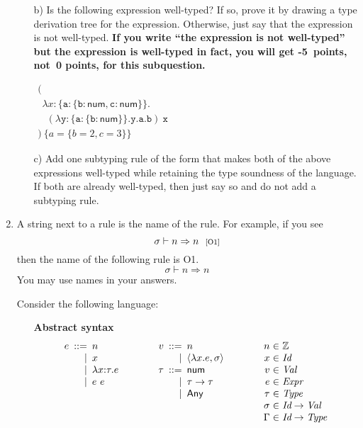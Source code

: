 \begin{enumerate}
\begin{itemize}
\item[b)] Is the following expression well-typed? If so, prove it by
  drawing a type derivation tree for the expression. Otherwise, just say that
    the expression is not well-typed. \textbf{If you write ``the expression is not
    well-typed'' but the expression is well-typed in fact, you will get
    -5~points, not~0 points, for this subquestion.}

$
  \begin{array}{l}
    ( \\
    \ \ \lambda x{:}\{\texttt{a}{:}\{\texttt{b}{:}\textsf{num},\texttt{c}{:}\textsf{num}\}\}. \\
    \ \ \ \ (\lambda \texttt{y}{:}\{\texttt{a}{:}\{\texttt{b}{:}\textsf{num}\}\}.
    \texttt{y}.\texttt{a}.\texttt{b})\ \texttt{x} \\
    )\ \{a=\{b=2,c=3\}\}
  \end{array}
$

\item[c)] Add one subtyping rule of the form
  \fbox{$\tau<:\tau$} that makes both of the above expressions
  well-typed while retaining the type soundness of the language.
  If both are already well-typed, then just say so and do not add a
  subtyping rule.
\end{itemize}

\item A string next to a rule is the name of the rule.
For example, if you see
\[
    \sigma\vdash n\Rightarrow n
    \ \ \text{\scriptsize[O1]}
\]
then the name of the following rule is O1.
\[
    \sigma\vdash n\Rightarrow n
\]
You may use names in your answers.

Consider the following language:
  \begin{itemize}
    \item[] \textbf{Abstract syntax}
  \[
    \begin{array}{
        r@{\hskip5pt}r@{\hskip5pt}l@{\hskip40pt}
        r@{\hskip5pt}r@{\hskip5pt}l@{\hskip40pt}
        r@{\hskip3pt}r@{\hskip3pt}l
      }
      e &::=& n & v &::=& n & n &\in& \mathbb{Z} \\
      &|& x &&|& \clo{x}{e}{\sigma} & x &\in& \textit{Id} \\
      &|& \lambda x{:}\tau.e & \tau &::=& \textsf{num} & v &\in& \textit{Val} \\
      &|& e\ e &&|& \tau\rightarrow\tau & e &\in& \textit{Expr} \\
      &&&&|& \textsf{Any} & \tau &\in& \textit{Type} \\
      &&&&&& \sigma &\in& \textit{Id}\rightarrow\textit{Val} \\
      &&&&&& \Gamma &\in& \textit{Id}\rightarrow\textit{Type} \\
    \end{array}
  \]


\end{itemize}
\end{enumerate}
